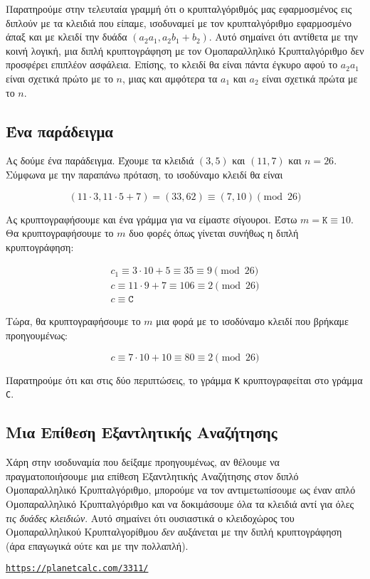 \documentclass{article}
\begin{document}
Παρατηρούμε στην τελευταία γραμμή ότι ο κρυπταλγόριθμός μας εφαρμοσμένος εις διπλούν με τα κλειδιά που είπαμε, ισοδυναμεί με τον κρυπταλγόριθμο εφαρμοσμένο άπαξ και με κλειδί την δυάδα $(a_2a_1, a_2b_1 + b_2)$. Αυτό σημαίνει ότι αντίθετα με την κοινή λογική, μια διπλή κρυπτογράφηση με τον Ομοπαραλληλικό Κρυπταλγόριθμο δεν προσφέρει επιπλέον ασφάλεια. Επίσης, το κλειδί θα είναι πάντα έγκυρο αφού το $a_2a_1$ είναι σχετικά πρώτο με το $n$, μιας και αμφότερα τα $a_1$ και $a_2$ είναι σχετικά πρώτα με το $n$.

\subsection*{Ένα παράδειγμα}

Ας δούμε ένα παράδειγμα. Έχουμε τα κλειδιά $(3, 5)$ και $(11, 7)$ και $n = 26$. Σύμφωνα με την παραπάνω πρόταση, το ισοδύναμο κλειδί θα είναι

$$(11 \cdot 3, 11 \cdot 5 + 7) = (33, 62) \equiv (7, 10) \pmod{26}$$

Ας κρυπτογραφήσουμε και ένα γράμμα για να είμαστε σίγουροι. Έστω $m = \mathtt{K} \equiv 10$. Θα κρυπτογραφήσουμε το $m$ δυο φορές όπως γίνεται συνήθως η διπλή κρυπτογράφηση:

\begin{gather*}
    c_1 \equiv 3 \cdot 10 + 5 \equiv 35 \equiv 9 \pmod{26} \\
    c \equiv 11 \cdot 9 + 7 \equiv 106 \equiv 2 \pmod{26} \\
    c \equiv \mathtt{C}
\end{gather*}

Τώρα, θα κρυπτογραφήσουμε το $m$ μια φορά με το ισοδύναμο κλειδί που βρήκαμε προηγουμένως:

$$c \equiv 7 \cdot 10 + 10 \equiv 80 \equiv 2 \pmod{26}$$

Παρατηρούμε ότι και στις δύο περιπτώσεις, το γράμμα \texttt{K} κρυπτογραφείται στο γράμμα \texttt{C}.

\subsection*{Μια Επίθεση Εξαντλητικής Αναζήτησης}

Χάρη στην ισοδυναμία που δείξαμε προηγουμένως, αν θέλουμε να πραγματοποιήσουμε μια επίθεση Εξαντλητικής Αναζήτησης στον διπλό Ομοπαραλληλικό Κρυπταλγόριθμο, μπορούμε να τον αντιμετωπίσουμε ως έναν απλό Ομοπαραλληλικό Κρυπταλγόριθμο και να δοκιμάσουμε όλα τα κλειδιά αντί για όλες \emph{τις δυάδες κλειδιών}. Αυτό σημαίνει ότι ουσιαστικά ο κλειδοχώρος του Ομοπαραλληλικού Κρυπταλγορίθμου \emph{δεν} αυξάνεται με την διπλή κρυπτογράφηση (άρα επαγωγικά ούτε και με την πολλαπλή).

\begin{thebibliography}{1}
    \texttt{\url{https://planetcalc.com/3311/}}
\end{thebibliography}
\end{document}
